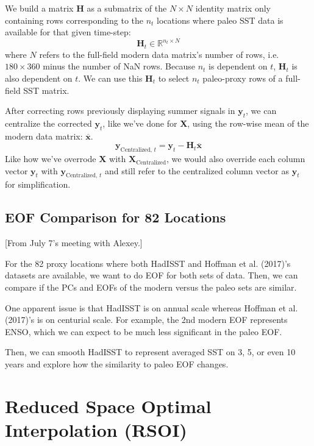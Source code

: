 \documentclass{article}
\begin{document}
We build a matrix \textbf{H} as a submatrix of the $N \times N$ identity matrix only containing rows corresponding to the $n_t$ locations where paleo SST data is available for that given time-step:
$$\textbf{H}_t \in \mathbb{R}^{n_t \times N}$$
where $N$ refers to the full-field modern data matrix's number of rows, i.e. $180 \times 360$ minus the number of NaN rows. Because $n_t$ is dependent on $t$, $\textbf{H}_t$ is also dependent on $t$. We can use this $\textbf{H}_t$ to select $n_t$ paleo-proxy rows of a full-field SST matrix.

After correcting rows previously displaying summer signals in $\textbf{y}_t$, we can centralize the corrected $\textbf{y}_t$, like we've done for \textbf{X},  using the row-wise mean of the modern data matrix: $\overline{\textbf{x}}$. 
$$\textbf{y}_{\text{Centralized, }t} = \textbf{y}_t - \textbf{H}_t \overline{\textbf{x}}$$
Like how we've overrode \textbf{X} with $\textbf{X}_{\text{Centralized}}$, we would also override each column vector $\textbf{y}_t$ with $\textbf{y}_{\text{Centralized, }t}$ and still refer to the centralized column vector as $\textbf{y}_t$ for simplification.

\subsection{EOF Comparison for 82 Locations}
\color{purple} [From July 7's meeting with Alexey.] \color{black}

For the 82 proxy locations where both HadISST and Hoffman et al. (2017)'s datasets are available, we want to do EOF for both sets of data. Then, we can compare if the PCs and EOFs of the modern versus the paleo sets are similar.

One apparent issue is that HadISST is on annual scale whereas Hoffman et al. (2017)'s is on centurial scale. For example, the 2nd modern EOF represents ENSO, which we can expect to be much less significant in the paleo EOF.

Then, we can smooth HadISST to represent averaged SST on 3, 5, or even 10 years and explore how the similarity to paleo EOF changes.

\section{Reduced Space Optimal Interpolation (RSOI)}
\end{document}
